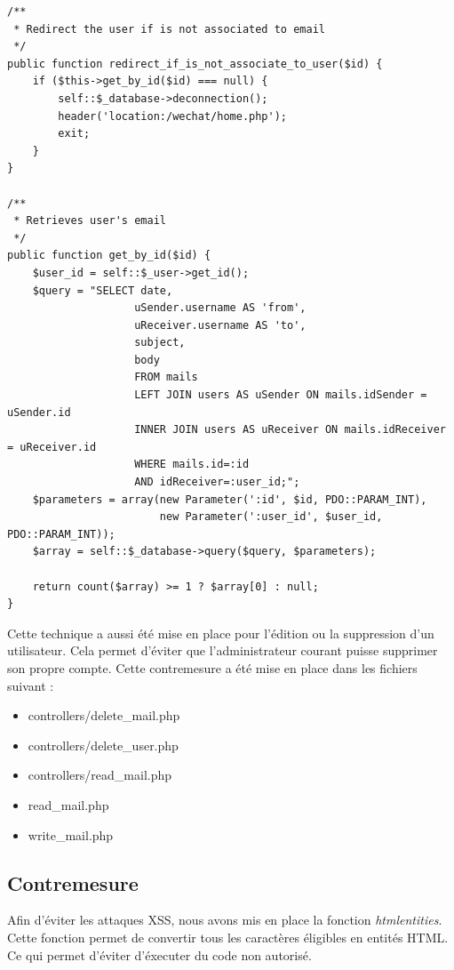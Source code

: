 \documentclass[12pt]{article}
\begin{document}
\begin{lstlisting}[style=JAVA]
/**
 * Redirect the user if is not associated to email
 */
public function redirect_if_is_not_associate_to_user($id) {
    if ($this->get_by_id($id) === null) {
        self::$_database->deconnection();
        header('location:/wechat/home.php');
        exit;
    }
}

/**
 * Retrieves user's email
 */
public function get_by_id($id) {
    $user_id = self::$_user->get_id();
    $query = "SELECT date, 
                    uSender.username AS 'from', 
                    uReceiver.username AS 'to', 
                    subject, 
                    body 
                    FROM mails 
                    LEFT JOIN users AS uSender ON mails.idSender = uSender.id 
                    INNER JOIN users AS uReceiver ON mails.idReceiver = uReceiver.id 
                    WHERE mails.id=:id 
                    AND idReceiver=:user_id;";
    $parameters = array(new Parameter(':id', $id, PDO::PARAM_INT),
                        new Parameter(':user_id', $user_id, PDO::PARAM_INT));
    $array = self::$_database->query($query, $parameters);

    return count($array) >= 1 ? $array[0] : null;
}
\end{lstlisting}

Cette technique a aussi été mise en place pour l'édition ou la suppression d'un utilisateur. Cela permet d'éviter que l'administrateur courant puisse supprimer son propre compte.
Cette contremesure a été mise en place dans les fichiers suivant :

\begin{itemize}
\item controllers/delete\_mail.php
\item controllers/delete\_user.php
\item controllers/read\_mail.php
\item read\_mail.php
\item write\_mail.php
\end{itemize}

\newpage
\subsection{Contremesure}\label{c2}

Afin d'éviter les attaques XSS, nous avons mis en place la fonction \textit{htmlentities}. Cette fonction permet de convertir tous les caractères éligibles en entités HTML. Ce qui permet d'éviter d'éxecuter du code non autorisé.
\end{document}
